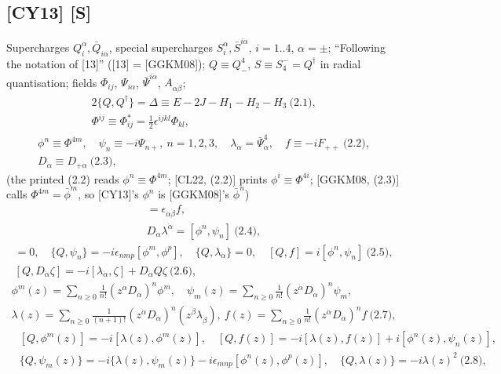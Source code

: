 \documentclass[10pt]{article}
\begin{document}
\subsection{[CY13] [S]}
Supercharges $Q^\alpha_i,\bar Q_{i\dot\alpha}$, special supercharges $S^\alpha_i,\bar S^{i\dot\alpha}$, $i=1..4$, $\alpha=\pm$; ``Following the notation of [13]'' ([13] = [GGKM08]); $Q\equiv Q^4_-$, $S\equiv S^-_4=Q^\dagger$ in radial quantisation; fields $\Phi_{ij}$, $\Psi_{i\alpha}$, $\bar\Psi^{i\dot\alpha}$, $A_{\alpha\dot\beta}$;
\begin{gather*}
2\{Q,Q^\dagger\}=\Delta\equiv E-2J-H_1-H_2-H_3\ \text{(2.1)},\\ \Phi^{ij}\equiv\Phi_{ij}^*=\tfrac12\epsilon^{ijkl}\Phi_{kl},
\end{gather*}
\begin{gather*}
\phi^n\equiv\Phi^{4m},\quad \psi_n\equiv-i\Psi_{n+},\ n=1,2,3,\quad \lambda_{\dot\alpha}=\bar\Psi^4_{\dot\alpha},\quad f\equiv-iF_{++}\ \text{(2.2)},\\ D_{\dot\alpha}\equiv D_{+\dot\alpha}\ \text{(2.3)},
\end{gather*}
(the printed (2.2) reads $\phi^n\equiv\Phi^{4m}$; [CL22, (2.2)] prints $\phi^i\equiv\Phi^{4i}$; [GGKM08, (2.3)] calls $\Phi^{4m}=\bar\phi^m$, so [CY13]'s $\phi^n$ is [GGKM08]'s $\bar\phi^n$)
\begin{gather*}
[D_{\dot\alpha},D_{\dot\beta}]=\epsilon_{\dot\alpha\dot\beta}f,\\ D_{\dot\alpha}\lambda^{\dot\alpha}=[\phi^n,\psi_n]\ \text{(2.4)},
\end{gather*}
\begin{gather*}
[Q,\phi^n]=0,\quad \{Q,\psi_n\}=-i\epsilon_{nmp}[\phi^m,\phi^p],\quad \{Q,\lambda_{\dot\alpha}\}=0,\quad [Q,f]=i[\phi^n,\psi_n]\ \text{(2.5)},\\ [Q,D_{\dot\alpha}\zeta]=-i[\lambda_{\dot\alpha},\zeta]+D_{\dot\alpha}Q\zeta\ \text{(2.6)},
\end{gather*}
\begin{gather*}
\phi^m(z)=\sum_{n\ge0}\tfrac1{n!}(z^{\dot\alpha}D_{\dot\alpha})^n\phi^m,\quad \psi_m(z)=\sum_{n\ge0}\tfrac1{n!}(z^{\dot\alpha}D_{\dot\alpha})^n\psi_m,\\ \lambda(z)=\sum_{n\ge0}\tfrac1{(n+1)!}(z^{\dot\alpha}D_{\dot\alpha})^n(z^{\dot\beta}\lambda_{\dot\beta}),\ f(z)=\sum_{n\ge0}\tfrac1{n!}(z^{\dot\alpha}D_{\dot\alpha})^nf\ \text{(2.7)},
\end{gather*}
\begin{equation*}
\begin{aligned}
&[Q,\phi^m(z)]=-i[\lambda(z),\phi^m(z)],\quad [Q,f(z)]=-i[\lambda(z),f(z)]+i[\phi^n(z),\psi_n(z)],\\
&\{Q,\psi_m(z)\}=-i\{\lambda(z),\psi_m(z)\}-i\epsilon_{mnp}[\phi^n(z),\phi^p(z)],\quad \{Q,\lambda(z)\}=-i\lambda(z)^2\ \text{(2.8)},
\end{aligned}
\end{equation*}
\end{document}
